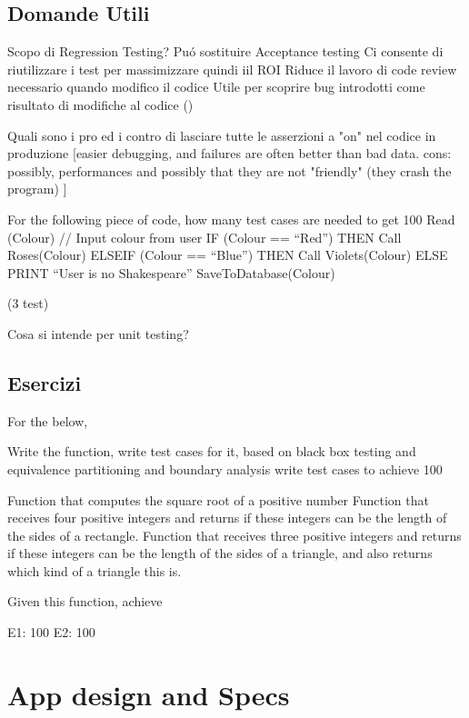 \begin{itemize}
\section{Domande Utili}
Scopo di Regression Testing?
	Pu\'o sostituire Acceptance testing
	Ci consente di riutilizzare i test per massimizzare quindi iil ROI
	Riduce il lavoro di code review necessario quando modifico il codice
	Utile per scoprire bug introdotti come risultato di modifiche al codice ()

Quali sono i pro ed i contro di lasciare tutte le asserzioni a "on" nel codice in produzione
	[easier debugging, and failures are often better than bad data. 
cons: possibly, performances and possibly that they are not "friendly" (they crash the program) ]

For the following piece of code, how many test cases are needed to get 100%
Read (Colour) // Input colour from user
IF (Colour == “Red”) THEN
    Call Roses(Colour)
ELSEIF (Colour == “Blue”) THEN
    Call Violets(Colour)
ELSE
    PRINT “User is no Shakespeare”
SaveToDatabase(Colour)

(3 test)

Cosa si intende per unit testing?

\section{Esercizi}
For the below,

    Write the function,
    write test cases for it, based on black box testing and equivalence partitioning and boundary analysis
    write test cases to achieve 100%

    Function that computes the square root of a positive number
    Function that receives four positive integers and returns if these integers can be the length of the sides of a rectangle. 
    Function that receives three positive integers and returns if these integers can be the length of the sides of a triangle, and also returns which kind of a triangle this is. 

Given this function, achieve

    E1: 100%
    E2: 100%


\chapter{App design and Specs}


\end{itemize}
